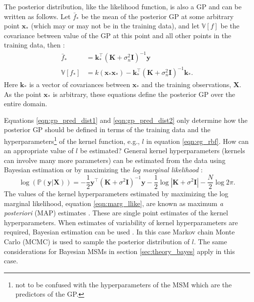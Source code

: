 The posterior distribution, like the likelihood function, is also a GP and can be written as follows.  Let $\bar{f}_{*}$ be the mean of the posterior GP at some arbitrary point $\mathbf{x}_{*}$ (which may or may not be in the training data), and let $\mathbb{V}\left[f\right]$ be the covariance between value of the GP at this point and all other points in the training data, then \cite{rasmussenGaussianProcessesMachine2006}:
\begin{align}
\bar{f}_{*} &=\mathbf{k}_{*}^{\top}\left(\mathbf{K}+\sigma_{n}^{2} \mathbf{I}\right)^{-1} \mathbf{y} \label{eqn:gp_pred_dist1} \\
\mathbb{V}\left[f_{*}\right] &=k\left(\mathbf{x}_{*} \mathbf{x}_{*}\right)-\mathbf{k}_{*}^{\top}\left(\mathbf{K}+\sigma_{n}^{2} \mathbf{I}\right)^{-1} \mathbf{k}_{*}. \label{eqn:gp_pred_dist2}
\end{align}
Here $\mathbf{k}_{*}$ is a vector of covariances between $\mathbf{x}_{*}$ and the training observations, $\mathbf{X}$. As the point $\mathbf{x}_{*}$ is arbitrary, these equations define the posterior GP over the entire domain. 

Equations \ref{eqn:gp_pred_dist1} and \ref{eqn:gp_pred_dist2} only determine how the posterior GP should be defined in terms of the training data and the hyperparameters\footnote{not to be confused with the hyperparameters of the MSM which are the predictors of the GP.} of the kernel function, e.g., $l$ in equation \ref{eqn:eg_rbf}. How can an appropriate value of $l$ be estimated? General kernel hyperparameters (kernels can involve many more parameters) can be estimated from the data using Bayesian estimation or by maximizing the \emph{log marginal likelihood} \cite{rasmussenGaussianProcessesMachine2006}:
\begin{equation}\label{eqn:marg_llike}
\log{\left( \mathbb{P}(\mathbf{y} | \mathbf{X})\right)}=-\frac{1}{2} \mathbf{y}^{\top}\left(\mathbf{K}+\sigma^{2} \mathbf{I}\right)^{-1} \mathbf{y}-\frac{1}{2} \log \left|\mathbf{K}+\sigma^{2} \mathbf{I}\right|-\frac{N}{2} \log 2 \pi.
\end{equation}
The values of the kernel hyperparameters estimated by maximizing the log marginal likelihood, equation \ref{eqn:marg_llike}, are known as maximum \emph{a posteriori} (MAP) estimates \cite{rasmussenGaussianProcessesMachine2006}. These are single point estimates of the kernel hyperparameters. When estimates of variability of kernel hyperparameters are required, Bayesian estimation can be used \cite{gelmanBayesianDataAnalysis2014}. In this case Markov chain Monte Carlo (MCMC) is used to sample the posterior distribution of $l$. The same considerations for Bayesian MSMs in section \ref{sec:theory_bayes} apply in this case. 

